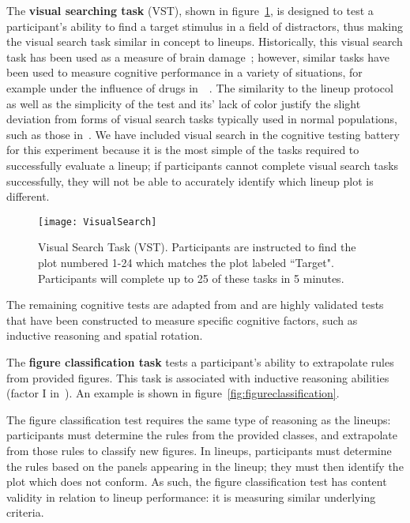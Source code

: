 \documentclass[journal]{vgtc}\usepackage[]{graphicx}\usepackage[]{color}
\begin{document}
The \textbf{visual searching task} (VST), shown in figure~\ref{fig:VST}, is designed to test a participant's ability to find a target stimulus in a field of distractors, thus making the visual search task similar in concept to lineups. Historically, this visual search task has been used as a measure of brain damage~\cite{goldstein1973validity,demita1981validity,moerland1986neuropsychological}; however, similar tasks have been used to measure cognitive performance in a variety of situations, for example under the influence of drugs in~~\cite{anderson1983interactive}. The similarity to the lineup protocol as well as the simplicity of the test and its' lack of color justify the slight deviation from forms of visual search tasks typically used in normal populations, such as those in~\cite{wolfe1990limitations,treisman1980feature}. 
We have included visual search in the cognitive testing battery for this experiment because it is the most simple of the tasks required to successfully evaluate a lineup; if participants cannot complete visual search tasks successfully, they will not be able to accurately identify which lineup plot is different. 


\begin{figure}[htp]\centering
\texttt{[image: VisualSearch]}
\caption[Visual Search Task]{Visual Search Task (VST). Participants are instructed to find the plot numbered 1-24 which matches the plot labeled ``Target". Participants will complete up to 25 of these tasks in 5 minutes.}\label{fig:VST}
\end{figure}

The remaining cognitive tests are adapted from \cite{ekstrom1976manual} and are highly validated tests that have been constructed to measure specific cognitive factors, such as inductive reasoning and spatial rotation.

The \textbf{figure classification task} tests a participant's ability to extrapolate rules from provided figures. This task is associated with inductive reasoning abilities (factor I  in~\cite{ekstrom1976manual}). An example is shown in figure~\ref{fig:figureclassification}. 

The figure classification test requires the same type of reasoning as the lineups: participants must determine the rules from the provided classes, and extrapolate from those rules to classify new figures. In lineups, participants must determine the rules based on the panels appearing in the lineup; they must then identify the plot which does not conform. As such, the figure classification test has content validity in relation to lineup performance: it is measuring similar underlying criteria. 
\end{document}
